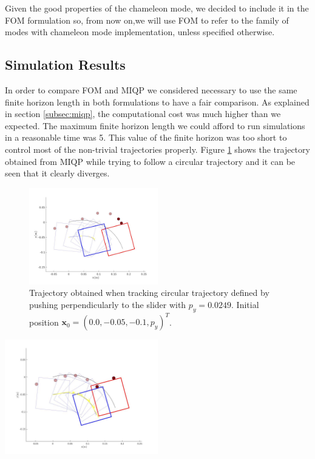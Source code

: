 \documentclass[12,twoside]{TFG-GM}
\theoremstyle{definition}
\theoremstyle{remark}
\begin{document}
Given the good properties of the chameleon mode, we decided to include it in the FOM formulation so, from now on,we will use FOM to refer to the family of modes with chameleon mode implementation, unless specified otherwise.

\subsection{Simulation Results}
\label{subsec:simresults}

In order to compare FOM and MIQP we considered necessary to use the same finite horizon length in both formulations to have a fair comparison. As explained in section \ref{subsec:miqp}, the computational cost was much higher than we expected. The maximum finite horizon length we could afford to run simulations in a reasonable time was 5. This value of the finite horizon was too short to control most of the non-trivial trajectories properly. Figure \ref{fig:MIQP_trajectory} shows the trajectory obtained from MIQP while trying to follow a circular trajectory and it can be seen that it clearly diverges.

\newpage

\begin{figure}
\begin{center}
\includegraphics[width=0.5\textwidth]{MIQP_trajectory.jpg}
\end{center}
\caption{\label{fig:MIQP_trajectory} \small Trajectory obtained when tracking circular trajectory defined by pushing perpendicularly to the slider with $p_y = 0.0249$. Initial position $\textbf{x}_0 = (0.0, -0.05, -0.1, p_y)^T$.}
\end{figure}


\begin{center}\includegraphics[width=0.5\textwidth] {clustered_miqp.jpg} 
\label{fig:clustered_miqp}
\end{center}
\end{document}
